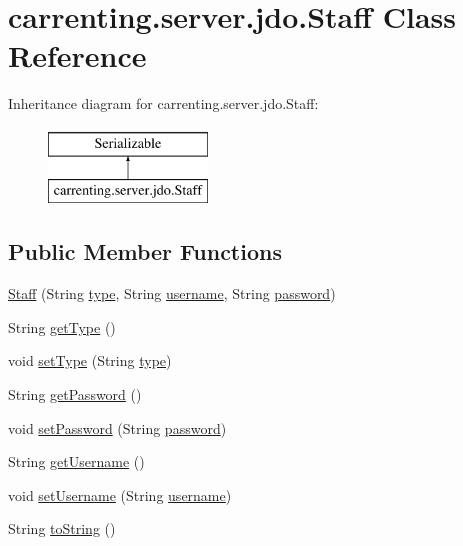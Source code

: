 \hypertarget{classcarrenting_1_1server_1_1jdo_1_1_staff}{}\section{carrenting.\+server.\+jdo.\+Staff Class Reference}
\label{classcarrenting_1_1server_1_1jdo_1_1_staff}
Inheritance diagram for carrenting.\+server.\+jdo.\+Staff\+:\begin{figure}[H]
\begin{center}
\leavevmode
\includegraphics[height=2.000000cm]{classcarrenting_1_1server_1_1jdo_1_1_staff}
\end{center}
\end{figure}
\subsection*{Public Member Functions}
\begin{DoxyCompactItemize}
\item 
\mbox{\hyperlink{classcarrenting_1_1server_1_1jdo_1_1_staff_ae44967323617b6fe2c0404270a5470d4}{Staff}} (String \mbox{\hyperlink{classcarrenting_1_1server_1_1jdo_1_1_staff_a10c0416d6043122204e301b5626c78d5}{type}}, String \mbox{\hyperlink{classcarrenting_1_1server_1_1jdo_1_1_staff_a38063bb7f3d9cfa4b9c3eff15638ecbc}{username}}, String \mbox{\hyperlink{classcarrenting_1_1server_1_1jdo_1_1_staff_adbd5952cba08906f79b3e40e58bfbf6e}{password}})
\item 
String \mbox{\hyperlink{classcarrenting_1_1server_1_1jdo_1_1_staff_ad13da1463d4261eeddd1b024c553ed0f}{get\+Type}} ()
\item 
void \mbox{\hyperlink{classcarrenting_1_1server_1_1jdo_1_1_staff_aab439e670c4510cf12c034346516f9c4}{set\+Type}} (String \mbox{\hyperlink{classcarrenting_1_1server_1_1jdo_1_1_staff_a10c0416d6043122204e301b5626c78d5}{type}})
\item 
String \mbox{\hyperlink{classcarrenting_1_1server_1_1jdo_1_1_staff_aeb06f4e58a110ec1d95628d45639c11b}{get\+Password}} ()
\item 
void \mbox{\hyperlink{classcarrenting_1_1server_1_1jdo_1_1_staff_a2a08cc3b72ef4cf6edf7488b96853b36}{set\+Password}} (String \mbox{\hyperlink{classcarrenting_1_1server_1_1jdo_1_1_staff_adbd5952cba08906f79b3e40e58bfbf6e}{password}})
\item 
String \mbox{\hyperlink{classcarrenting_1_1server_1_1jdo_1_1_staff_a6a9d8bdaa6ef11454f1b61d99d684f9f}{get\+Username}} ()
\item 
void \mbox{\hyperlink{classcarrenting_1_1server_1_1jdo_1_1_staff_ad3cb53b148561fde8d503f02718090b0}{set\+Username}} (String \mbox{\hyperlink{classcarrenting_1_1server_1_1jdo_1_1_staff_a38063bb7f3d9cfa4b9c3eff15638ecbc}{username}})
\item 
String \mbox{\hyperlink{classcarrenting_1_1server_1_1jdo_1_1_staff_a4b37251253fe5f6bce2a0ef4561c35ac}{to\+String}} ()
\end{DoxyCompactItemize}
